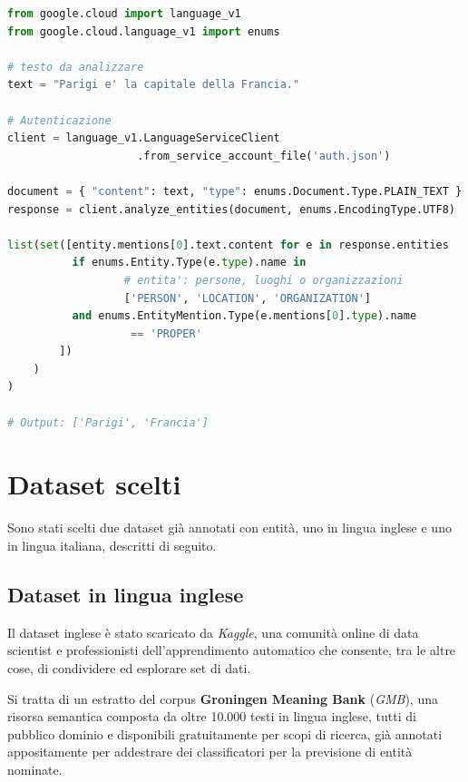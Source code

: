 \documentclass[a4paper,11pt]{article}
\begin{document}
\clearpage
\begin{lstlisting}[basicstyle=\small, language=python, frame=single, caption={Esempio di codice Python per l'estrazione di entità con \textit{Google Cloud}.},captionpos=b]
from google.cloud import language_v1
from google.cloud.language_v1 import enums

# testo da analizzare
text = "Parigi e' la capitale della Francia."

# Autenticazione
client = language_v1.LanguageServiceClient
                    .from_service_account_file('auth.json')
                    
document = { "content": text, "type": enums.Document.Type.PLAIN_TEXT }
response = client.analyze_entities(document, enums.EncodingType.UTF8)

list(set([entity.mentions[0].text.content for e in response.entities
          if enums.Entity.Type(e.type).name in 
                  # entita': persone, luoghi o organizzazioni
                  ['PERSON', 'LOCATION', 'ORGANIZATION']
          and enums.EntityMention.Type(e.mentions[0].type).name 
                   == 'PROPER'
        ])
    )
)

# Output: ['Parigi', 'Francia']
\end{lstlisting}

\section{Dataset scelti}
\label{sec:dataset}
Sono stati scelti due dataset già annotati con entità, uno in lingua inglese e uno in lingua italiana, descritti di seguito.

\subsection{Dataset in lingua inglese}
\label{ssec:dataset_en}
Il dataset inglese è stato scaricato da \textit{Kaggle}, una comunità online di data scientist e professionisti dell'apprendimento automatico che consente, tra le altre cose, di condividere ed esplorare set di dati. \cite{dataset-en}

Si tratta di un estratto del corpus \textbf{Groningen Meaning Bank} (\textit{GMB}), una risorsa semantica composta da oltre 10.000 testi in lingua inglese, tutti di pubblico dominio e disponibili gratuitamente per scopi di ricerca, già annotati appositamente per addestrare dei classificatori per la previsione di entità nominate.
\end{document}
